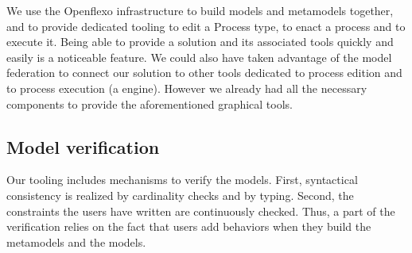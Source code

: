 We use the Openflexo infrastructure to build models and metamodels
together, and to provide dedicated tooling to edit a Process type, to enact a
process and to execute it. Being able to provide a solution and its associated
tools quickly and easily is a noticeable feature.  We could also have taken
advantage of the model federation to connect our solution to other tools
dedicated to process edition and to process execution (\eg a \BPMN engine).
However we already had all the necessary components to provide the
aforementioned graphical tools.

\subsection{Model verification}


Our tooling includes mechanisms to verify the models. First, syntactical
consistency is realized by cardinality checks and by typing. Second, the
constraints the users have written are continuously checked. Thus, a part of
the verification relies on the fact that users add behaviors when they build
the metamodels and the models.
